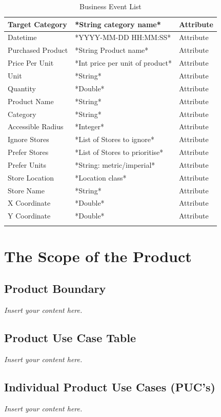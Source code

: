 \documentclass[12pt]{article}
\newcommand{\lips}{\textit{Insert your content here.}}
\begin{document}
\begin{longtable}{| >{\raggedright\arraybackslash}p{} | >{\raggedright\arraybackslash}p{} | >{\raggedright\arraybackslash}p{} |}
        Target Category & *String category name* & Attribute \\
        \hline 
        Datetime & *YYYY-MM-DD HH:MM:SS* & Attribute \\
        \hline 
        Purchased Product & *String Product name* & Attribute \\
        \hline 
        Price Per Unit & *Int price per unit of product* & Attribute \\
        \hline 
        Unit & *String* & Attribute \\
        \hline 
        Quantity & *Double* & Attribute \\
        \hline 
        Product Name & *String* & Attribute \\
        \hline 
        Category & *String* & Attribute \\
        \hline 
        Accessible Radius & *Integer* & Attribute \\
        \hline 
        Ignore Stores & *List of Stores to ignore* & Attribute \\
        \hline 
        Prefer Stores & *List of Stores to prioritise* & Attribute \\
        \hline 
        Prefer Units & *String: metric/imperial* & Attribute \\
        \hline
        Store Location & *Location class* & Attribute \\
        \hline 
        Store Name & *String* & Attribute \\
        \hline 
        X Coordinate & *Double* & Attribute \\
        \hline 
        Y Coordinate & *Double* & Attribute \\
        \hline 
        \caption{Business Event List}
        \label{tab:businesseventlist}
    \end{longtable}

\section{The Scope of the Product}
\subsection{Product Boundary}
\lips
\subsection{Product Use Case Table}
\lips
\subsection{Individual Product Use Cases (PUC's)}
\lips
\end{document}
